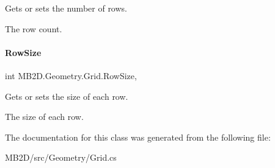 Gets or sets the number of rows. 

The row count.\hypertarget{class_m_b2_d_1_1_geometry_1_1_grid_a38536c42bc3d3d5e58d648fd7b7f8e17}{}\label{class_m_b2_d_1_1_geometry_1_1_grid_a38536c42bc3d3d5e58d648fd7b7f8e17} 
\paragraph{\texorpdfstring{Row\+Size}{RowSize}}
{\footnotesize\ttfamily int M\+B2\+D.\+Geometry.\+Grid.\+Row\+Size\hspace{0.3cm}{\ttfamily [get]}, {\ttfamily [set]}}



Gets or sets the size of each row. 

The size of each row.

The documentation for this class was generated from the following file\+:\begin{DoxyCompactItemize}
\item 
M\+B2\+D/src/\+Geometry/Grid.\+cs\end{DoxyCompactItemize}
